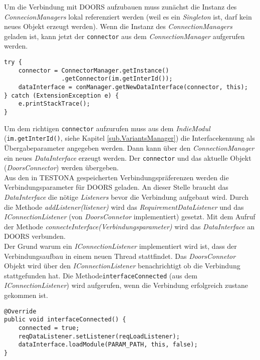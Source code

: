 Um die Verbindung mit DOORS aufzubauen muss zunächst die Instanz des \textit{ConnecionManagers} lokal referenziert werden (weil es ein \textit{Singleton} ist, darf kein neues Objekt erzeugt werden). Wenn die Instanz des \textit{ConnectionManagers} geladen ist, kann jetzt der \texttt{connector} aus dem \textit{ConnectionManager} aufgerufen werden.

\begin{lstlisting}[caption={Verbindungsaufbau}, captionpos=b]
try {
	connector = ConnectorManager.getInstance()
				.getConnector(im.getInterId());
	dataInterface = conManager.getNewDataInterface(connector, this);
} catch (ExtensionException e) {
	e.printStackTrace();
}
\end{lstlisting}

 Um dem richtigen \texttt{connector} aufzurufen muss aus dem \textit{IndieModul} (\texttt{im.getInterId()}, siehe Kapitel \ref{sub.VariantsManager}) die Interfacekennung als Übergabeparameter angegeben werden. Dann kann über den \textit{ConnectionManager} ein neues \textit{DataInterface} erzeugt werden. Der \texttt{connector} und das aktuelle Objekt (\textit{DoorsConnector}) werden übergeben.\\
 
Aus den in TESTONA gespeicherten Verbindungspräferenzen werden die Verbindungsparameter für DOORS geladen. An dieser Stelle braucht das \textit{DataInterface} die nötige \textit{Listeners} bevor die Verbindung aufgebaut wird. Durch die Methode \textit{addListener(listener)} wird das \textit{RequirementDataListener} und das \textit{IConnectionListener} (von \textit{DoorsConnetor} implementiert) gesetzt. Mit dem Aufruf der Methode \textit{connecteInterface(Verbindungsparameter)} wird das \textit{DataInterface} an DOORS verbunden.\\

Der Grund warum ein \textit{IConnectionListener} implementiert wird ist, dass der Verbindungsaufbau in einem neuen Thread stattfindet. Das \textit{DoorsConnetor} Objekt wird über den \textit{IConnectionListener} benachrichtigt ob die Verbindung stattgefunden hat. Die Methode\texttt{interfaceConnected} (aus dem \textit{IConnectionListener}) wird aufgerufen, wenn die Verbindung erfolgreich zustane gekommen ist.

\begin{lstlisting}[caption={Verbindungsaufbau war erfolgreich}, captionpos=b]
@Override
public void interfaceConnected() {
	connected = true;
	reqDataListener.setListener(reqLoadListener);
	dataInterface.loadModule(PARAM_PATH, this, false);
}
\end{lstlisting}

